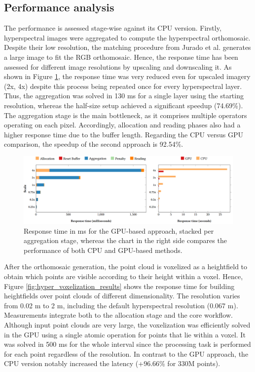 \subsection{Performance analysis}

The performance is assessed stage-wise against its CPU version. Firstly, hyperspectral images were aggregated to compute the hyperspectral orthomosaic. Despite their low resolution, the matching procedure from Jurado et al. \cite{jurado_efficient_2022} generates a large image to fit the RGB orthomosaic. Hence, the response time has been assessed for different image resolutions by upscaling and downscaling it. As shown in Figure \ref{fig:hyper_aggregation_results}, the response time was very reduced even for upscaled imagery (2x, 4x) despite this process being repeated once for every hyperspectral layer. Thus, the aggregation was solved in 130 \si{\milli\second} for a single layer using the starting resolution, whereas the half-size setup achieved a significant speedup (74.69\%). The aggregation stage is the main bottleneck, as it comprises multiple operators operating on each pixel. Accordingly, allocation and reading phases also had a higher response time due to the buffer length. Regarding the CPU versus GPU comparison, the speedup of the second approach is 92.54\%.

\begin{figure}[bt]
    \centering
    \includegraphics[width=\linewidth]{figs/hyper_point_cloud/hyper_aggregation_performance.png}
    \caption{Response time in \si{\milli\second} for the GPU-based approach, stacked per aggregation stage, whereas the chart in the right side compares the performance of both CPU and GPU-based methods.}
    \label{fig:hyper_aggregation_results}
\end{figure}

After the orthomosaic generation, the point cloud is voxelized as a heightfield to obtain which points are visible according to their height within a voxel. Hence, Figure \ref{fig:hyper_voxelization_results} shows the response time for building heightfields over point clouds of different dimensionality. The resolution varies from 0.02 \si{\meter} to 2 \si{\meter}, including the default hyperspectral resolution (0.067 \si{\meter}). Measurements integrate both to the allocation stage and the core workflow. Although input point clouds are very large, the voxelization was efficiently solved in the GPU using a single atomic operation for points that lie within a voxel. It was solved in 500 \si{\milli\second} for the whole interval since the processing task is performed for each point regardless of the resolution. In contrast to the GPU approach, the CPU version notably increased the latency (+96.66\% for 330M points).

